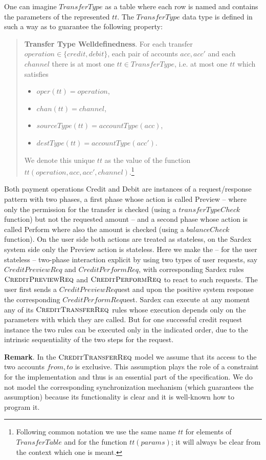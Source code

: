 One can imagine $TransferType$ as a table where each row is named and contains the parameters of the represented $tt$. The $TransferType$ data type is defined in such a way as to guarantee the following property: 
\begin{quote} 
	{\bf Transfer Type Welldefinedness}. For each transfer $operation \in \{credit,debit\}$, each pair of accounts $acc,acc'$ and each $channel$ there is at most one $tt \in TransferType$, i.e. at most one $tt$ which satisfies
	\begin{itemize}
		\item $oper(tt) = operation$,
		\item $chan(tt)=channel$,
		\item $sourceType(tt)=accountType(acc)$,
		\item $destType(tt)=accountType(acc')$.
	\end{itemize} 
We denote this unique $tt$ as the value of the function $tt(operation,acc,acc',channel)$.\footnote{Following common notation we use the same name $tt$ for elements of $TransferTable$ and for the function $tt(params)$; it will always be clear from the context which one is meant.}
\end{quote}


Both payment operations Credit and Debit are instances of a request/response pattern with two phases, a first phase whose action is called Preview -- where only the permission for the transfer is checked (using a $transferTypeCheck$ function) but not the requested amount -- and  a second phase whose action is called Perform where also the amount is checked (using a $balanceCheck$ function). On the user side both actions are treated as stateless, on the Sardex system side only the Preview action is stateless. Here we make the -- for the user stateless -- two-phase interaction explicit by using two  types of user requests, say $CreditPreviewReq$ and $CreditPerformReq$, with corresponding Sardex rules $\hbox{\sc CreditPreviewReq}$ and $\hbox{\sc CreditPerformReq}$ to react to such requests. The user first sends a $CreditPreviewReq$uest and upon the positive system response the corresponding $CreditPerformReq$uest. Sardex can execute at any moment any of its $\hbox{\sc CreditTransferReq}$ rules whose execution depends only on the parameters with which they are called. But for one successful credit request instance the two rules can be executed only in the indicated order, due to the intrinsic sequentiality of the two steps for the request.

{\bf Remark}. In the $\hbox{\sc CreditTransferReq}$ model we assume that its access to the two accounts $from, to$ is exclusive. This assumption plays the role of a constraint for the implementation and thus is an essential part of the specification. We do not model the corresponding synchronization mechanism (which guarantees the assumption) because its functionality is clear and it is well-known how to program it. 

